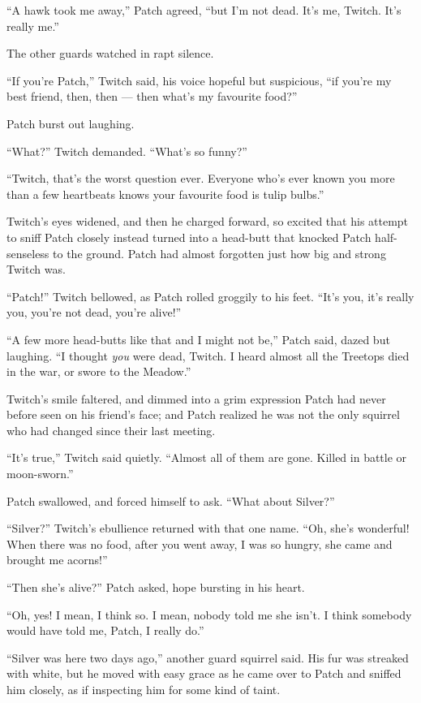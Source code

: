 \documentclass[ebook,oneside,openany,17pt]{memoir}
\begin{document}
“A hawk took me away,” Patch agreed, “but I’m not dead. It’s me,
Twitch. It’s really me.”

The other guards watched in rapt silence.

“If you’re Patch,” Twitch said, his voice hopeful but suspicious, “if
you’re my best friend, then, then — then what’s my favourite food?”

Patch burst out laughing.

“What?” Twitch demanded. “What’s so funny?”

“Twitch, that’s the worst question ever. Everyone who’s ever known you
more than a few heartbeats knows your favourite food is tulip bulbs.”

Twitch’s eyes widened, and then he charged forward, so excited that
his attempt to sniff Patch closely instead turned into a head-butt
that knocked Patch half-senseless to the ground. Patch had almost
forgotten just how big and strong Twitch was.

“Patch!” Twitch bellowed, as Patch rolled groggily to his feet. “It’s
you, it’s really you, you’re not dead, you’re alive!”

“A few more head-butts like that and I might not be,” Patch said,
dazed but laughing. “I thought \emph{you} were dead, Twitch. I heard
almost all the Treetops died in the war, or swore to the Meadow.”

Twitch’s smile faltered, and dimmed into a grim expression Patch had
never before seen on his friend’s face; and Patch realized he was not
the only squirrel who had changed since their last meeting.

“It’s true,” Twitch said quietly. “Almost all of them are gone. Killed
in battle or moon-sworn.”

Patch swallowed, and forced himself to ask. “What about Silver?”

“Silver?” Twitch’s ebullience returned with that one name. “Oh, she’s
wonderful! When there was no food, after you went away, I was so
hungry, she came and brought me acorns!”

“Then she’s alive?” Patch asked, hope bursting in his heart.

“Oh, yes! I mean, I think so. I mean, nobody told me she isn’t. I
think somebody would have told me, Patch, I really do.”

“Silver was here two days ago,” another guard squirrel said. His fur
was streaked with white, but he moved with easy grace as he came over
to Patch and sniffed him closely, as if inspecting him for some kind
of taint.
\end{document}
